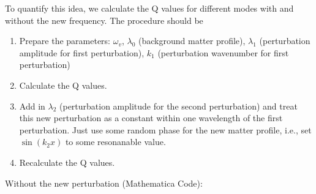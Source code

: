 \documentclass[letterpaper,12pt,english]{sphinxmanual}
\begin{document}
To quantify this idea, we calculate the Q values for different modes with and without the new frequency. The procedure should be
\begin{enumerate}
\item {} 
Prepare the parameters: \(\omega_v\), \(\lambda_0\) (background matter profile), \(\lambda_1\) (perturbation amplitude for first perturbation), \(k_1\) (perturbation wavenumber for first perturbation)

\item {} 
Calculate the Q values.

\item {} 
Add in \(\lambda_2\) (perturbation amplitude for the second perturbation) and treat this new perturbation as a constant within one wavelength of the first perturbation. Just use some random phase for the new matter profile, i.e., set \(\sin(k_2 x)\) to some resonanable value.

\item {} 
Recalculate the Q values.

\end{enumerate}

Without the new perturbation (Mathematica Code):
\end{document}
